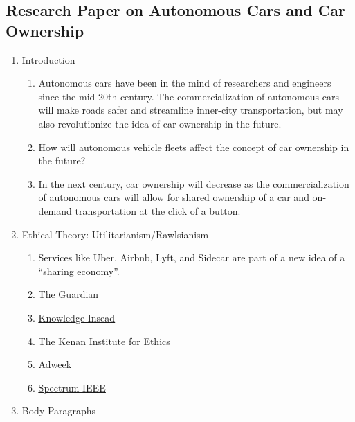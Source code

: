 \documentclass[letterpaper, 12pt]{article}
\begin{document}
\subsection*{Research Paper on Autonomous Cars and Car Ownership}
\begin{enumerate}
  \item Introduction
  \begin{enumerate}
    \item Autonomous cars have been in the mind of researchers and engineers
      since the mid-20th century. The commercialization of autonomous cars will
      make roads safer and streamline inner-city transportation, but may also
      revolutionize the idea of car ownership in the future.
    \item How will autonomous vehicle fleets affect the concept of car ownership
      in the future?
    \item In the next century, car ownership will decrease as the
      commercialization of autonomous cars will allow for shared ownership of
      a car and on-demand transportation at the click of a button.
  \end{enumerate}
  \item Ethical Theory: Utilitarianism/Rawlsianism
  \begin{enumerate}
    \item Services like Uber, Airbnb, Lyft, and Sidecar are part of a new idea
      of a ``sharing economy''.
    \item \href{https://www.theguardian.com/technology/2016/oct/17/sharing-economy-capitalism-uber-airbnb-ownership}{\underline{The Guardian}}
    \item \href{http://knowledge.insead.edu/responsibility/whos-responsible-the-ethics-of-the-sharing-economy-5034}{\underline{Knowledge Insead}}
    \item \href{https://kenan.ethics.duke.edu/wp-content/uploads/2012/08/Sharing-EconomyTN2015.pdf}{\underline{The Kenan Institute for Ethics}}
    \item \href{http://www.adweek.com/digital/sharing-economy-steeped-ethical-controversy/}{\underline{Adweek}}
    \item \href{http://spectrum.ieee.org/cars-that-think/transportation/self-driving/people-want-driverless-cars-with-utilitarian-ethics-unless-theyre-a-passenger}{\underline{Spectrum IEEE}}
  \end{enumerate}
  \item Body Paragraphs
  \begin{enumerate}

\end{enumerate}
\end{enumerate}
\end{document}
